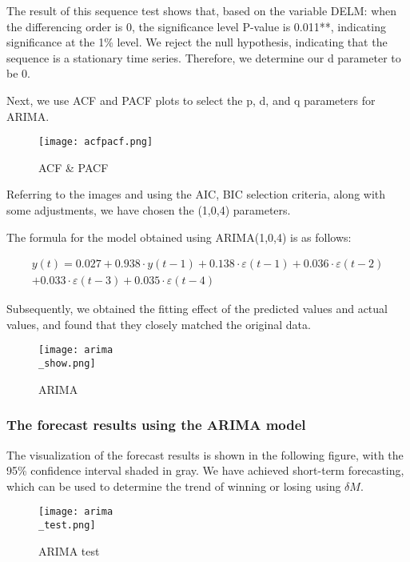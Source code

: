 \documentclass[12pt]{article}
\begin{document}
The result of this sequence test shows that, based on the variable DELM: when the differencing order is 0, the significance level P-value is 0.011**, indicating significance at the 1\% level. We reject the null hypothesis, indicating that the sequence is a stationary time series. Therefore, we determine our d parameter to be 0.

Next, we use ACF and PACF plots to select the p, d, and q parameters for ARIMA.

\begin{figure}[H]
\centering
\texttt{[image: acfpacf.png]}
\caption{ACF \& PACF}\label{fig:apacf}
\end{figure}

Referring to the images and using the AIC, BIC selection criteria, along with some adjustments, we have chosen the (1,0,4) parameters.

The formula for the model obtained using ARIMA(1,0,4) is as follows:

\begin{equation}\label{eq:arima}
\begin{split}
y(t)=0.027+0.938 \cdot y(t-1)+0.138 \cdot \varepsilon (t-1)+0.036 \cdot \varepsilon(t-2) \\
+0.033 \cdot \varepsilon(t-3)+0.035 \cdot \varepsilon(t-4)
\end{split}
\end{equation}

Subsequently, we obtained the fitting effect of the predicted values and actual values, and found that they closely matched the original data.

\begin{figure}[H]
\centering
\texttt{[image: arima\\\_show.png]}
\caption{ARIMA}\label{fig:arima}
\end{figure}


\subsubsection{The forecast results using the ARIMA model}
The visualization of the forecast results is shown in the following figure, with the 95\% confidence interval shaded in gray. We have achieved short-term forecasting, which can be used to determine the trend of winning or losing using $\delta M$.

\begin{figure}[H]
\centering
\texttt{[image: arima\\\_test.png]}
\caption{ARIMA test}\label{fig:ariamtest}
\end{figure}
\end{document}
